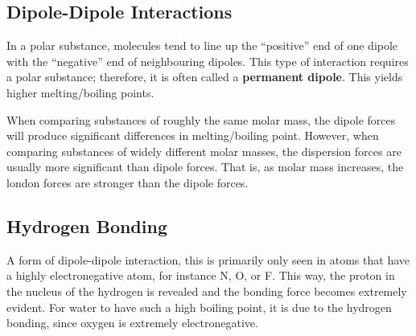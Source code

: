 \subsection{Dipole-Dipole Interactions}
In a polar substance, molecules tend to line up the ``positive'' end of one dipole with the
``negative'' end of neighbouring dipoles. This type of interaction requires a polar substance;
therefore, it is often called a \textbf{permanent dipole}. This yields higher melting/boiling
points.\\

\begin{important}
    When comparing substances of roughly the same molar mass, the dipole forces will produce significant
    differences in melting/boiling point. However, when comparing substances of widely different molar
    masses, the dispersion forces are usually more significant than dipole forces. That is, as
    molar mass increases, the london forces are stronger than the dipole forces.
\end{important}

\subsection{Hydrogen Bonding}
A form of dipole-dipole interaction, this is primarily only seen in atoms that have a highly
electronegative atom, for instance N, O, or F. This way, the proton in the nucleus of the hydrogen
is revealed and the bonding force becomes extremely evident. For water to have such a high boiling
point, it is due to the hydrogen bonding, since oxygen is extremely electronegative.
